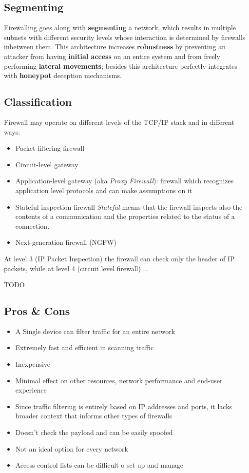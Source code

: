 \subsection{Segmenting}
Firewalling goes along with \textbf{segmenting} a network,
which results in multiple subnets with different security levels whose interaction is determined by firewalls inbetween them.
This architecture increases \textbf{robustness} by preventing an attacker from having \textbf{initial access} on an entire system and from freely performing \textbf{lateral movements};
besides this architecture perfectly integrates with \textbf{honeypot} deception mechanisms.

\subsection{Classification}
Firewall may operate on different levels of the TCP/IP stack and in different ways:
\begin{itemize}
   \item Packet filtering firewall
   \item Circuit-level gateway
   \item Application-level gateway (aka \textit{Proxy Firewall}):
   firewall which recognizes application level protocols and can make assumptions on it
   \item Stateful inspection firewall
   \textit{Stateful} means that the firewall inspects also the contents of a communication and the properties related to the status of a connection.
   \item Next-generation firewall (NGFW)
\end{itemize} 

At level 3 (IP Packet Inspection) the firewall can check only the header of IP packets,
while at level 4 (circuit level firewall) ...\nl

TODO\nl

\subsection{Pros \& Cons}
\begin{itemize}
   \color{darkgreen}
   \item A Single device can filter traffic for an entire network
   \item Extremely fast and efficient in scanning traffic
   \item Inexpensive
   \item Minimal effect on other resources, network performance and end-user experience
\end{itemize}

\begin{itemize}
   \color{darkred}
   \item Since traffic filtering is entirely based on IP addresses and ports,
   it lacks broader context that informs other types of firewalls
   \item Doesn't check the payload and can be easily spoofed
   \item Not an ideal option for every network
   \item Access control lists can be difficult o set up and manage
\end{itemize}
